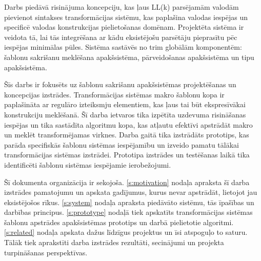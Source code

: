 Darbs piedāvā risinājuma koncepciju, kas ļaus LL(k) parsējamām valodām pievienot sintakses transformācijas sistēmu, kas paplašina valodas iespējas un specificē valodas konstrukcijas pielietošanas domēnam. Projektēta sistēma ir veidota tā, lai tās integrēšana ar kādu eksistējošu parsētāju pieprasītu pēc iespējas minimālas pūles. Sistēma sastāvēs no trim globālām komponentēm: šablonu sakrišanu meklēšana apakšsistēma, pārveidošanas apakšsistēma un tipu apakšsistēma. %

Šīs darbs ir fokusēts uz šablonu sakrišanu apakšsistēmas projektēšanas un koncepcijas izstrādes. Transformācijas sistēmas makro šablonu kopa ir paplašināta ar regulāro izteiksmju elementiem, kas ļaus tai būt ekspresīvākai konstrukciju meklēšanā. Šī darba ietvaros tika izpētīta uzdevuma risināšanas iespējas un tika sastādīta algoritmu kopa, kas atļautu efektīvi apstrādāt makro un meklēt transformējamas virknes. Darba gaitā tika izstrādāts prototips, kas parāda specifiskās šablonu sistēmas iespējamību un izveido pamatu tālākai transformācijas sistēmas izstrādei. Prototipa izstrādes un testēšanas laikā tika identificēti šablonu sistēmas iespējamie ierobežojumi.



Šī dokumenta organizācija ir sekojoša. \ref{s:motivation} nodaļa apraksta šī darba izstrādes pamatojumu un apskata gadījumus, kurus nevar apstrādāt, lietojot jau eksistējošos rīkus. \ref{s:system} nodaļa apraksta piedāvāto sistēmu, tās īpašības un darbības principus. \ref{s:prototype} nodaļā tiek apskatīts transformācijas sistēmas šablonu apstrādes apakšsistēmas prototips un darbā pielietotie algoritmi. \ref{s:related} nodaļa apskata dažus līdzīgus projektus un īsi atspoguļo to saturu. Tālāk tiek aprakstīti darba izstrādes rezultāti, secinājumi un projekta turpināšanas perspektīvas.